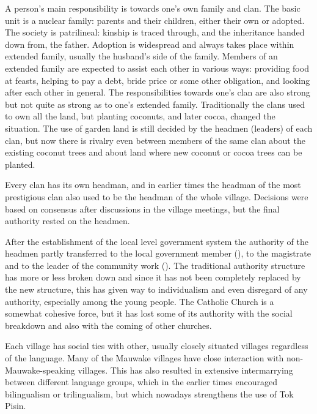 A person's main responsibility is towards one's own family and clan. The basic unit is a nuclear family: parents and their children, either their own or adopted.  The society is patrilineal: kinship is traced through, and the inheritance handed down from, the father. Adoption is widespread and always takes place within extended family, usually the husband's side of the family.  Members of an extended family are expected to assist each other in various ways: providing food at feasts, helping to pay a debt, bride price or some other obligation, and looking after each other in general. The responsibilities towards one's clan are also strong but not quite as strong as to one's extended family.  Traditionally the clans used to own all the land, but planting coconuts, and later cocoa, changed the situation.  The use of garden land is still decided by the headmen (leaders) of each clan, but now there is rivalry even between members of the same clan about the existing coconut trees and about land where new coconut or cocoa trees can be planted.

Every clan has its own headman, and in earlier times the headman of the most prestigious clan also used to be the headman of the whole village. Decisions were based on consensus after discussions in the village meetings, but the final authority rested on the headmen.

After the establishment of the local level government system the authority of the headmen partly transferred to the local government member (), to the magistrate and to the leader of the community work (). The traditional authority structure has more or less broken down and since it has not been completely replaced by the new structure, this has given way to individualism and even disregard of any authority, especially among the young people. The Catholic Church is a somewhat cohesive force, but it has lost some of its authority with the social breakdown and also with the coming of other churches.

Each village has social ties with other, usually closely situated villages regardless of the language.  Many of the Mauwake villages have close interaction with non-Mauwake-speaking villages.  This has also resulted in extensive intermarrying between different language groups, which in the earlier times encouraged bilingualism or trilingualism, but which nowadays strengthens the use of Tok Pisin.

